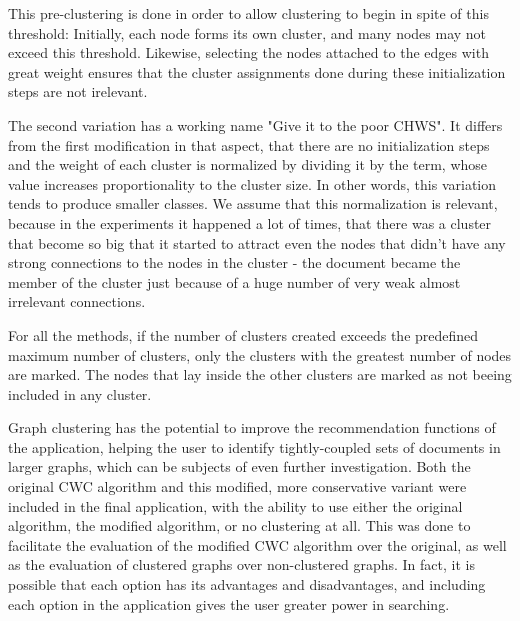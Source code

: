 This pre-clustering is done in order to allow clustering to begin in spite of this threshold: Initially, each node forms its own cluster, and many nodes may not exceed this threshold. Likewise, selecting the nodes attached to the edges with great weight ensures that the cluster assignments done during these initialization steps are not irelevant.

The second variation has a working name "Give it to the poor CHWS". It differs from the first modification in that aspect, that there are no initialization steps and the weight of each cluster is normalized by dividing it by the term, whose value increases proportionality to the cluster size. In other words, this variation tends to produce smaller classes. We assume that this normalization is relevant, because in the experiments it happened a lot of times, that there was a cluster that become so big that it started to attract even the nodes that didn't have any strong connections to the nodes in the cluster - the document became the member of the cluster just because of a huge number of very weak almost irrelevant connections.

For all the methods, if the number of clusters created exceeds the predefined maximum number of clusters, only the clusters with the greatest number of nodes are marked. The nodes that lay inside the other clusters are marked as not beeing included in any cluster.

Graph clustering has the potential to improve the recommendation functions of the application, helping the user to identify tightly-coupled sets of documents in larger graphs, which can be subjects of even further investigation. Both the original CWC algorithm and this modified, more conservative variant were included in the final application, with the ability to use either the original algorithm, the modified algorithm, or no clustering at all. This was done to facilitate the evaluation of the modified CWC algorithm over the original, as well as the evaluation of clustered graphs over non-clustered graphs. In fact, it is possible that each option has its advantages and disadvantages, and including each option in the application gives the user greater power in searching.
